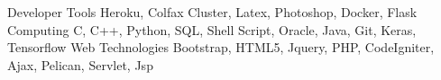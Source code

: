 \begin{cvhonorsx}
  \cvhonorx   
    {Developer Tools}
    {Heroku, Colfax Cluster, Latex, Photoshop, Docker, Flask}
    {}
    {}
  \cvhonorx
    {Computing}
    {C, C++, Python, SQL, Shell Script, Oracle, Java, Git, Keras, Tensorflow}
    {}
    {}
  \cvhonorx
    {Web Technologies}
    {Bootstrap, HTML5, Jquery, PHP, CodeIgniter, Ajax, Pelican, Servlet, Jsp}
    {}
    {}
\end{cvhonorsx}

